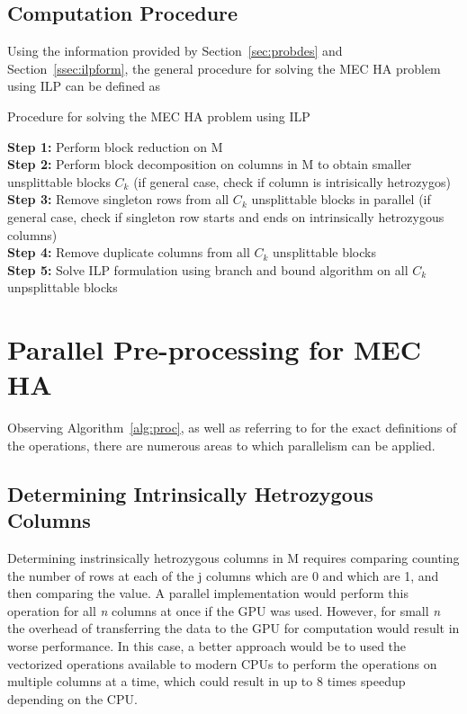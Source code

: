 \documentclass[10pt,twocolumn]{witseiepaper}
\begin{document}
\subsection{Computation Procedure}

Using the information provided by Section~\ref{sec:probdes} and Section~\ref{ssec:ilpform}, the general
procedure for solving the MEC HA problem using ILP can be defined as
\begin{algorithm}[t*]
    \small
    \caption{Procedure for solving the MEC HA problem using ILP}
    \label{alg:proc}
\textbf{Step 1:} Perform block reduction on M                                                                   \\
\textbf{Step 2:} Perform block decomposition on columns in M to obtain smaller unsplittable blocks $C_k$ (if 
general case, check if column is intrisically hetrozygos)                                                       \\
\textbf{Step 3:} Remove singleton rows from all $C_k$ unsplittable blocks in parallel (if general case, check 
if singleton row starts and ends on intrinsically hetrozygous columns)                                          \\
\textbf{Step 4:} Remove duplicate columns from all $C_k$ unsplittable blocks 							        \\
\textbf{Step 5:} Solve ILP formulation using branch and bound algorithm on all $C_k$ unpsplittable blocks 
\end{algorithm}


\section{ Parallel Pre-processing for MEC HA } \label{sec:parpre}

Observing Algorithm~\ref{alg:proc}, as well as referring to \cite{chen:2013} for the exact definitions of the
operations, there are numerous areas to which parallelism can be applied.

\subsection{ Determining Intrinsically Hetrozygous Columns}

Determining instrinsically hetrozygous columns in M requires comparing counting the number of rows at each of
the j columns which are 0 and which are 1, and then comparing the value. A parallel implementation would
perform this operation for all \textit{n} columns at once if the GPU was used. However, for small \textit{n}
the overhead of transferring the data to the GPU for computation would result in worse performance. In this
case, a better approach would be to used the vectorized operations available to modern CPUs to perform the
operations on multiple columns at a time, which could result in up to 8 times speedup depending on the CPU.
\end{document}
